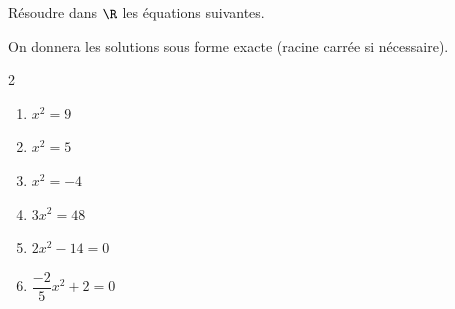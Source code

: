 \begin{exo}
	Résoudre dans $\R$ les équations suivantes.

	On donnera les solutions sous forme exacte (racine carrée si nécessaire).
	\vspace*{-2mm}
	\begin{multicols}{2}
		\begin{enumerate}[label=\alph*),itemsep=2mm]
			\item $x^2 = 9$
			\item $x^2 = 5$
			\item $x^2 = -4$
			\item $3x^2 = 48$
			\item $2x^2 - 14 = 0$
			\item $\dfrac{-2}{5}x^2 + 2 = 0$
		\end{enumerate}
	\end{multicols}
\end{exo}
